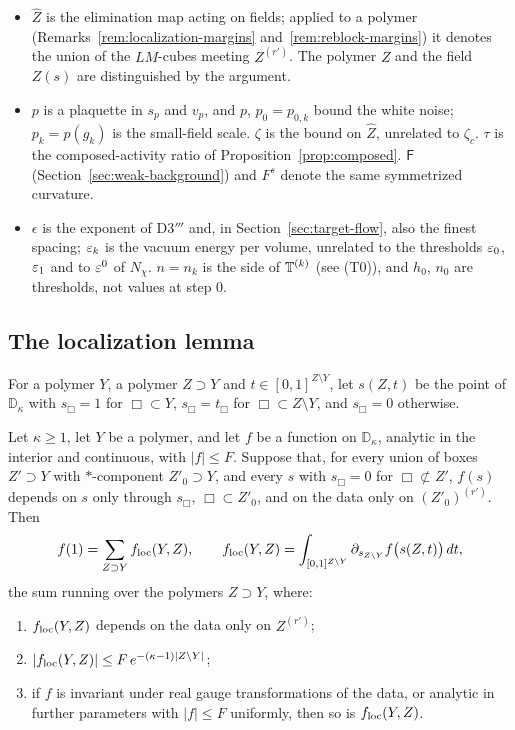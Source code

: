 \begin{remark}
\begin{itemize}
\item $\hat Z$ is the elimination map acting on fields; applied to a polymer (Remarks~\ref{rem:localization-margins} and~\ref{rem:reblock-margins}) it denotes the union of the $LM$-cubes meeting $Z^{(r')}$. The polymer $Z$ and the field $Z(s)$ are distinguished by the argument.
\item $p$ is a plaquette in $s_p$ and $v_p$, and $p$, $p_0=p_{0,k}$ bound the white noise; $p_k=p(g_k)$ is the small-field scale. $\zeta$ is the bound on $\hat Z$, unrelated to $\zeta_c$. $\tau$ is the composed-activity ratio of Proposition~\ref{prop:composed}. $\mathsf F$ (Section~\ref{sec:weak-background}) and $F^s$ denote the same symmetrized curvature.
\item $\epsilon$ is the exponent of D3$'''$ and, in Section~\ref{sec:target-flow}, also the finest spacing; $\varepsilon_k$ is the vacuum energy per volume, unrelated to the thresholds $\varepsilon_0$, $\varepsilon_1$ and to $\varepsilon^0$ of $N_\chi$. $n=n_k$ is the side of $\mathbb T^{(k)}$ (see (T0)), and $h_0$, $n_0$ are thresholds, not values at step $0$.
\end{itemize}
\end{remark}

\subsection{The localization lemma}\label{subsec:sq-loc}

For a polymer $Y$, a polymer $Z\supset Y$ and $t\in[0,1]^{Z\setminus Y}$, let $s(Z,t)$ be the point of $\mathbb D_\kappa$ with $s_\Box=1$ for $\Box\subset Y$, $s_\Box=t_\Box$ for $\Box\subset Z\setminus Y$, and $s_\Box=0$ otherwise.

\begin{lemma}[Localization]\label{lem:localization}
Let $\kappa\ge1$, let $Y$ be a polymer, and let $f$ be a function on $\mathbb D_\kappa$, analytic in the interior and continuous, with $|f|\le F$. Suppose that, for every union of boxes $Z'\supset Y$ with $*$-component $Z'_0\supset Y$, and every $s$ with $s_\Box=0$ for $\Box\not\subset Z'$, $f(s)$ depends on $s$ only through $s_\Box$, $\Box\subset Z'_0$, and on the data only on $(Z'_0)^{(r')}$. Then
\[
f(1)=\sum_{Z\supset Y}f_{\rm loc}(Y,Z),\qquad f_{\rm loc}(Y,Z)=\int_{[0,1]^{Z\setminus Y}}\partial_{s_{Z\setminus Y}}f\big(s(Z,t)\big)\,dt ,
\]
the sum running over the polymers $Z\supset Y$, where:
\begin{enumerate}[label=(\alph*)]
\item $f_{\rm loc}(Y,Z)$ depends on the data only on $Z^{(r')}$;
\item $|f_{\rm loc}(Y,Z)|\le F\,e^{-(\kappa-1)|Z\setminus Y|}$;
\item if $f$ is invariant under real gauge transformations of the data, or analytic in further parameters with $|f|\le F$ uniformly, then so is $f_{\rm loc}(Y,Z)$.
\end{enumerate}
\end{lemma}


